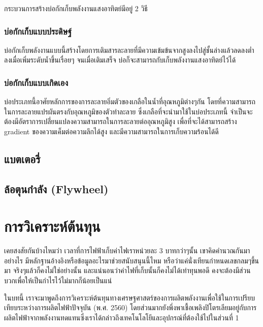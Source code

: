 \documentclass[11pt]{article}
\begin{document}
กระบวนการสร้างบ่อกักเก็บพลังงานแสงอาทิตย์มีอยู่ 2 วิธี

\subsubsection{บ่อกักเก็บแบบประดิษฐ์}
\label{sec:orgd31316a}

บ่อกักเก็บพลังงานแบบนี้สร้างโดยการเติมสารละลายที่มีความเข้มข้นจากสูงลงไปสู่ชั้นล่างแล้วลดลงต่ำลงเมื่อเพิ่มระดับน้ำขึ้นเรื่อยๆ จนเมื่อเติมเสร็จ บ่อก็จะสามารถกับเก็บพลังงานแสงอาทิตย์ไว้ได้

\subsubsection{บ่อกักเก็บแบบเกิดเอง}
\label{sec:org0fd23f5}

บ่อประเภทนี้อาศัยหลักการของการละลายอิ่มตัวของเกลือในน้ำที่อุณหภูมิต่างๆกัน โดยที่ความสามารถในการละลายแปรผันตรงกับอุณหภูมิของตัวทำละลาย ซึ่งเกลือที่จะนำมาใช้ในบ่อประเภทนี้ จำเป็นจะต้องมีอัตราการเปลี่่ยนแปลงความสามารถในการละลายต่ออุณหภูมิสูง เพื่อที่จะได้สามารถสร้าง gradient ของความเค็มต่อความลึกได้สูง และมีความสามารถในการเก็บความร้อนได้ดี
\subsection{แบตเตอรี่}
\label{sec:orgbcac65f}

\subsection{ล้อตุนกำลัง (Flywheel)}
\label{sec:org313ba94}

\section{การวิเคราะห์ต้นทุน}
\label{sec:orgebfffaf}

เคยสงสัยกันบ้างไหมว่า เวลาที่การไฟฟ้าเก็บค่าไฟเราหน่วยละ 3 บาทกว่าๆนั้น เขาคิดคำนวณกันมาอย่างไร มีหลักฐานอ้างอิงหรือข้อมูลอะไรมาช่วยสนับสนุนนี้ไหม หรือว่าแค่นั่งเทียนกำหนดเลขกลมๆขึ้นมา จริงๆแล้วก็คงไม่ใช่อย่างนั้น และแน่นอนว่าค่าไฟที่เก็บนั้นก็คงไม่ได้เท่าทุนพอดี คงจะต้องมีส่วนบวกเพื่อให้เป็นกำไรไว้ไม่มากก็น้อยเป็นแน่

ในบทนี้ เราจะมาพูดถึงการวิเคราะห์ต้นทุนทางเศรษฐศาสตร์ของการผลิตพลังงานเพื่อใช้ในการเปรียบเทียบระหว่างการผลิตไฟฟ้าปัจจุบัน (พ.ศ. 2560) โดยส่วนมากยังพึ่งพาเชื้อเพลิงปิโตรเลียมอยู่กับการผลิตไฟฟ้าจากพลังงานทดแทนซึ่งเราได้กล่าวถึงเทคโนโลโยีและอุปกรณ์ที่ต้องใช้ไปในส่วนที่ 1
\end{document}
